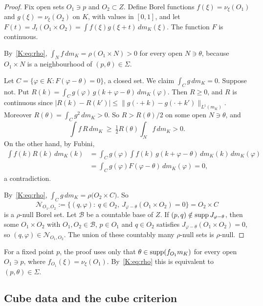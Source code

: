\begin{proof}
Fix open sets $O_1\ni p$ and $O_2\subset Z$.
Define Borel functions $f(\xi)=\nu_\xi(O_1)$ and $g(\xi)=\nu_\xi(O_2)$ on $K$, with values in
$[0,1]$, and let $F(t)=J_t(O_1\times O_2)=\int f(\xi)g(\xi+t)\,dm_K(\xi)$.
The function $F$ is continuous.

By~\eqref{K:eq:rho}, $\int_Nf\,dm_K=\rho(O_1\times N)>0$ for every open $N\ni\theta$, because
$O_1\times N$ is a neighbourhood of $(p,\theta)\in\Sigma$.

Let $C=\{\varphi\in K:F(\varphi-\theta)=0\}$, a closed set. We claim $\int_Cg\,dm_K=0$.
Suppose not.
Put $R(k)=\int_Cg(\varphi)\,g(k+\varphi-\theta)\,dm_K(\varphi)$.
Then $R\ge0$, and $R$ is continuous since
$|R(k)-R(k')|\le\|g(\cdot+k)-g(\cdot+k')\|_{L^1(m_K)}$.
Moreover $R(\theta)=\int_Cg^2\,dm_K>0$. So $R>R(\theta)/2$ on some open $N\ni\theta$, and
\[
\int f\,R\,dm_K\ \ge\ \tfrac12R(\theta)\int_Nf\,dm_K>0 .
\]
On the other hand, by Fubini,
\[
\begin{aligned}
\int f(k)R(k)\,dm_K(k)&=\int_Cg(\varphi)\int f(k)\,g(k+\varphi-\theta)\,dm_K(k)\,dm_K(\varphi)\\
&=\int_Cg(\varphi)F(\varphi-\theta)\,dm_K(\varphi)=0,
\end{aligned}
\]
a contradiction.

By~\eqref{K:eq:rho}, $\int_Cg\,dm_K=\rho\big(O_2\times C\big)$. So
\[
\mathcal N_{O_1,O_2}:=\{(q,\varphi):\ q\in O_2,\ J_{\varphi-\theta}(O_1\times O_2)=0\}=O_2\times C
\]
is a $\rho$-null Borel set.
Let $\mathcal B$ be a countable base of $Z$.
If $(p,q)\notin\operatorname{supp} J_{\varphi-\theta}$, then some $O_1\times O_2$ with $O_1,O_2\in\mathcal B$,
$p\in O_1$ and $q\in O_2$ satisfies $J_{\varphi-\theta}(O_1\times O_2)=0$, so
$(q,\varphi)\in\mathcal N_{O_1,O_2}$. The union of these countably many $\rho$-null sets is
$\rho$-null.
\end{proof}

\begin{remark}\label{K:rem:PS}
For a fixed point $p$, the proof uses only that $\theta\in\operatorname{supp}(f_{O_1}m_K)$ for every open
$O_1\ni p$, where $f_{O_1}(\xi)=\nu_\xi(O_1)$. By~\eqref{K:eq:rho} this is equivalent to
$(p,\theta)\in\Sigma$.
\end{remark}

\subsection{Cube data and the cube criterion}\label{K:ssec:criterion}

